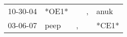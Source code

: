 \begin{supertabular}{lllll}
 10-30-04 &  *OE1* &    &  , &   anuk \\
 03-06-07 &   peep &  , &    &  *CE1* \\
\end{supertabular}
